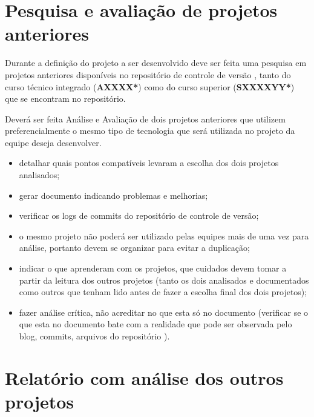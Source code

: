 
\section{Pesquisa e avaliação de projetos  anteriores}\label{atv-avaliacao-projetos-anteriores}
Durante a definição do projeto a ser desenvolvido deve ser feita uma pesquisa em projetos anteriores disponíveis no repositório de controle de versão , tanto do curso técnico integrado (\textbf{AXXXX*}) como do curso superior (\textbf{SXXXXYY*}) que se encontram no repositório.

Deverá ser feita Análise e Avaliação de dois projetos anteriores que utilizem preferencialmente o mesmo tipo de tecnologia que será utilizada no projeto da equipe deseja desenvolver.
\begin{itemize}
    \item detalhar quais pontos compatíveis levaram a escolha dos dois projetos analisados;
    
    \item gerar documento indicando problemas e melhorias;
    
    \item verificar os logs de commits do repositório de controle de versão;
    
    \item o mesmo projeto não poderá ser utilizado pelas equipes mais de uma vez para análise, portanto devem se organizar para evitar a duplicação;
    
    
    \item indicar o que aprenderam com os projetos, que cuidados devem tomar a partir da leitura dos outros projetos (tanto os dois analisados e documentados como outros que tenham lido antes de fazer a escolha final dos dois projetos);
    
    \item fazer análise crítica, não acreditar no que esta só no documento (verificar se o que esta no documento bate com a realidade que pode ser observada pelo blog, \glspl{commit}, arquivos do repositório ).
\end{itemize}


\section{Relatório com análise dos outros projetos}\label{atv-relatorio-analise-projetos}

